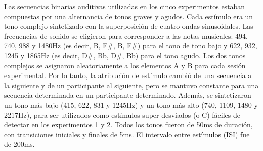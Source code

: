 
Las secuencias binarias auditivas utilizadas en los cinco experimentos estaban compuestas por una alternancia de tonos graves y agudos. Cada estímulo era un tono complejo sintetizado con la superposición de cuatro ondas sinusoidales. Las frecuencias de sonido se eligieron para corresponder a las notas musicales: 494, 740, 988 y 1480Hz (es decir, B, F\#, B, F\#) para el tono de tono bajo y 622, 932, 1245 y 1865Hz (es decir, D\#, Bb, D\#, Bb) para el tono agudo. Los dos tonos complejos se asignaron aleatoriamente a los elementos A y B para cada sesión experimental. Por lo tanto, la atribución de estímulo cambió de una secuencia a la siguiente y de un participante al siguiente, pero se mantuvo constante para una secuencia determinada en un participante determinado. Además, se sintetizaron un tono más bajo (415, 622, 831 y 1245Hz) y un tono más alto (740, 1109, 1480 y 2217Hz), para ser utilizados como estímulos super-desviados (o C) fáciles de detectar en los experimentos 1 y 2. Todos los tonos fueron de 50ms de duración, con transiciones iniciales y finales de 5ms. El intervalo entre estímulos (ISI) fue de 200ms.


